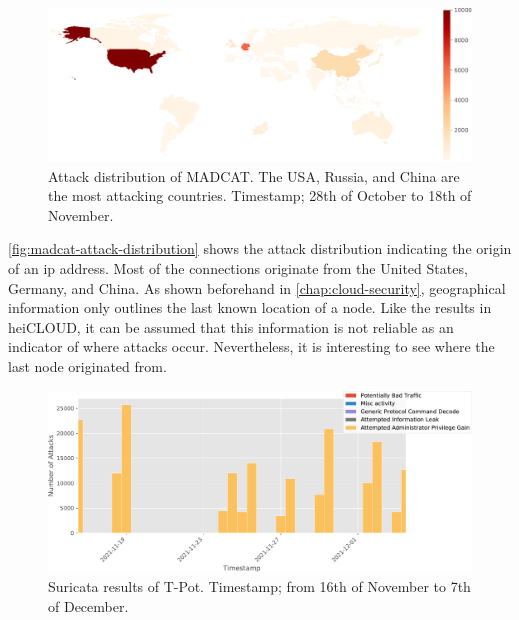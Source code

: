 \begin{figure}
    \centering
    \includegraphics[width=\textwidth]{figures/madcat-overview-map.pdf}
    \caption[Attack distribution of MADCAT]{
        Attack distribution of MADCAT.
        The USA, Russia, and China are the most attacking countries.
        Timestamp; 28th of October to 18th of November.
    }
    \label{fig:madcat-attack-distribution}
\end{figure}

\autoref{fig:madcat-attack-distribution} shows the attack distribution indicating the origin of an \ac{ip} address.
Most of the connections originate from the United States, Germany, and China.
As shown beforehand in \autoref{chap:cloud-security}, geographical information only outlines the last known location of a node.
Like the results in heiCLOUD, it can be assumed that this information is not reliable as an indicator of where attacks occur.
Nevertheless, it is interesting to see where the last node originated from.

\begin{figure}
    \centering
    \includegraphics[width=\textwidth]{figures/madcat-suricata-alerts.pdf}
    \caption[Suricata results of T-Pot]{
        Suricata results of T-Pot.
        Timestamp; from 16th of November to 7th of December.
    }
    \label{fig:suricata-distribution}
\end{figure}

